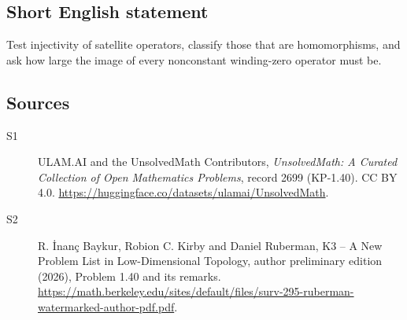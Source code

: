 \documentclass[11pt]{article}
\begin{document}
\subsection{Short English statement}
Test injectivity of satellite operators, classify those that are homomorphisms, and ask how large the image of every nonconstant winding-zero operator must be.
\subsection{Sources}
\begin{description}
\item[\hypertarget{source:2699:1}{S1}] ULAM.AI and the UnsolvedMath Contributors, \emph{UnsolvedMath: A Curated Collection of Open Mathematics Problems}, record 2699 (KP-1.40). CC BY 4.0. \url{https://huggingface.co/datasets/ulamai/UnsolvedMath}.
\item[\hypertarget{source:2699:2}{S2}] R. \.{I}nan\c{c} Baykur, Robion C. Kirby and Daniel Ruberman, K3 -- A New Problem List in Low-Dimensional Topology, author preliminary edition (2026), Problem 1.40 and its remarks. \url{https://math.berkeley.edu/sites/default/files/surv-295-ruberman-watermarked-author-pdf.pdf}.
\end{description}
\label{end:2699}
\end{document}
